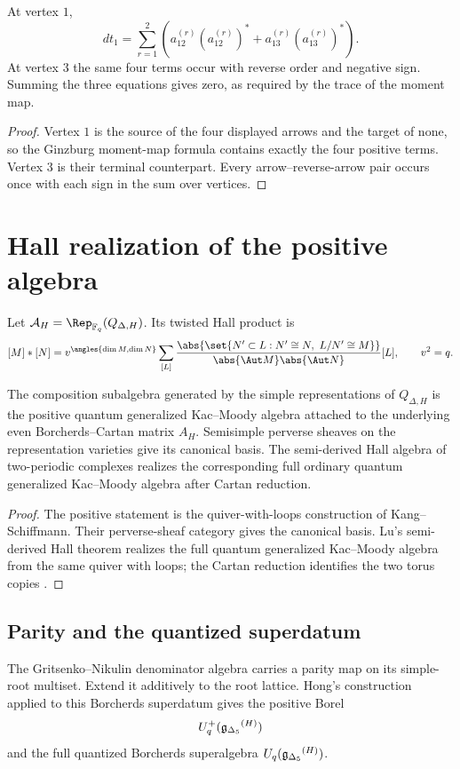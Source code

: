 \begin{calculation}
At vertex $1$,
\[
 d t_1=
 \sum_{r=1}^2
 \left(
 a_{12}^{(r)}(a_{12}^{(r)})^*
 +a_{13}^{(r)}(a_{13}^{(r)})^*
 \right).
\]
At vertex $3$ the same four terms occur with reverse order and negative sign.  Summing the three equations gives zero, as required by the trace of the moment map.
\end{calculation}
\begin{proof}
Vertex $1$ is the source of the four displayed arrows and the target of none, so the Ginzburg moment-map formula contains exactly the four positive terms.  Vertex $3$ is their terminal counterpart.  Every arrow--reverse-arrow pair occurs once with each sign in the sum over vertices.
\end{proof}


\chapter{Hall realization of the positive algebra}
Let $\mathcal A_H=\Rep_{\mathbb F_q}(Q_{\Delta,H})$.  Its twisted Hall product is
\[
 [M]*[N]
 =v^{\angles{\dim M,\dim N}}
 \sum_{[L]}
 \frac{\abs{\set{N'\subset L:N'\cong N,\ L/N'\cong M}}}
      {\abs{\Aut M}\abs{\Aut N}}
 [L],
 \qquad v^2=q.
\]

\begin{theorem}
The composition subalgebra generated by the simple representations of $Q_{\Delta,H}$ is the positive quantum generalized Kac--Moody algebra attached to the underlying even Borcherds--Cartan matrix $A_H$.  Semisimple perverse sheaves on the representation varieties give its canonical basis.  The semi-derived Hall algebra of two-periodic complexes realizes the corresponding full ordinary quantum generalized Kac--Moody algebra after Cartan reduction.
\end{theorem}
\begin{proof}
The positive statement is the quiver-with-loops construction of Kang--Schiffmann.  Their perverse-sheaf category gives the canonical basis.  Lu's semi-derived Hall theorem realizes the full quantum generalized Kac--Moody algebra from the same quiver with loops; the Cartan reduction identifies the two torus copies \cite{KangSchiffmann,LuBorcherdsHall,AxtellLee}.
\end{proof}

\section{Parity and the quantized superdatum}
The Gritsenko--Nikulin denominator algebra carries a parity map on its simple-root multiset.  Extend it additively to the root lattice.  Hong's construction applied to this Borcherds superdatum gives the positive Borel
\[
 U_q^+({\mathfrak g_{\Delta_5}}^{(H)})
\]
and the full quantized Borcherds superalgebra $U_q({\mathfrak g_{\Delta_5}}^{(H)})$.

